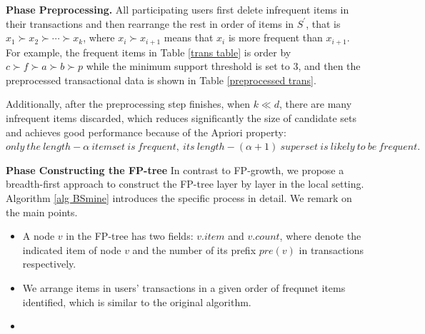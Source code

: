 \documentclass[conference]{IEEEtran}
\begin{document}
\textbf{Phase \uppercase\expandafter{} Preprocessing.} All participating users first delete infrequent items in their transactions and then rearrange the rest in order of items in $S^{\prime}$, that is $x_1 \succ x_2 \succ \cdots  \succ x_k$, where $x_i \succ x_{i+1}$ means that $x_i$ is more frequent than $x_{i+1}$. For example, the frequent items in Table \ref{trans table} is order by $c\succ f\succ a\succ b\succ p$ while the minimum support threshold is set to 3, and then the preprocessed transactional data is shown in Table \ref{preprocessed trans}.

Additionally, after the preprocessing step finishes, when $k \ll d$, there are many infrequent items discarded, which reduces significantly the size of candidate sets and achieves good performance because of the Apriori property\cite{apr}: $only\ the\ length-\alpha\ itemset\ is\ frequent,\ its\ length-(\alpha +1)\ superset\ is\ likely\ to\ be\ frequent.$

\textbf{Phase \uppercase\expandafter{} Constructing the FP-tree} In contrast to FP-growth, we propose a breadth-first approach to construct the FP-tree layer by layer in the local setting. Algorithm \ref{alg BSmine} introduces the specific process in detail. We remark on the main points.

\begin{itemize}
\item A node $v$ in the FP-tree has two fields: $v.item$ and $v.count$, where denote the indicated item of node $v$ and the number of its prefix $pre(v)$ in transactions respectively.
\item We arrange items in users' transactions in a given order of frequnet items identified, which is similar to the original algorithm. 
\item 
\end{itemize}
\end{document}
